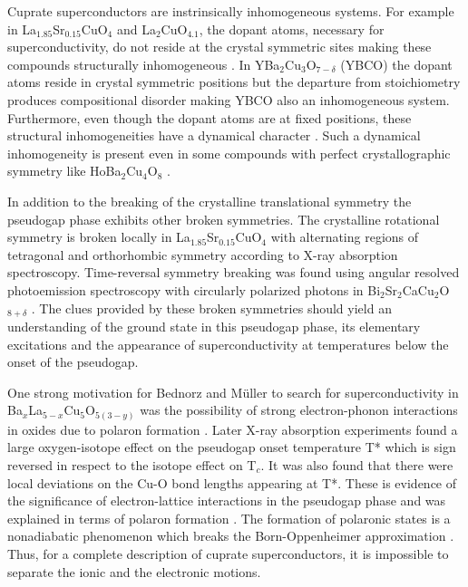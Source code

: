 Cuprate superconductors are instrinsically inhomogeneous systems.
For example in La$_{1.85}$Sr$_{0.15}$CuO$_{4}$ and La$_{2}$CuO$_{4.1}$, the dopant atoms, necessary for superconductivity, do not reside at the crystal symmetric sites making these compounds structurally inhomogeneous \cite{Poccia2011}.
In YBa$_2$Cu$_3$O$_{7-\delta}$ (YBCO) the dopant atoms reside in crystal symmetric positions but the departure from stoichiometry produces compositional disorder \cite{Chen1988,Andersen1990} making YBCO also an inhomogeneous system.
Furthermore, even though the dopant atoms are at fixed positions, these structural inhomogeneities have a dynamical character \cite{Mihailovic2005,Bianconi1996}.
Such a dynamical inhomogeneity is present even in some compounds with perfect crystallographic symmetry like HoBa$_{2}$Cu$_{4}$O$_{8}$ \cite{RubioTemprano2000}.

In addition to the breaking of the crystalline translational symmetry the pseudogap phase exhibits other broken symmetries. 
The crystalline rotational symmetry is broken locally in La$_{1.85}$Sr$_{0.15}$CuO$_{4}$ with alternating regions of tetragonal and orthorhombic symmetry \cite{Bianconi1996} according to X-ray absorption spectroscopy. 
Time-reversal symmetry breaking was found using angular resolved photoemission spectroscopy with circularly polarized photons in Bi$_{2}$Sr$_{2}$CaCu$_{2}$O$_{8+\delta}$ \cite{Kaminski2002}. 
The clues provided by these broken symmetries should yield an understanding of the ground state in this pseudogap phase, its elementary excitations and the appearance of superconductivity at temperatures below the onset of the pseudogap. 

One strong motivation for Bednorz and M\"{u}ller to search for superconductivity in Ba$_x$La$_{5-x}$Cu$_5$O$_{5(3-y)}$ was the possibility of strong electron-phonon interactions in oxides due to polaron formation \cite{Bednorz1986}.
Later X-ray absorption experiments found a large oxygen-isotope effect on the pseudogap onset temperature T* which is sign reversed in respect to the isotope effect on T$_c$.
It was also found that there were local deviations on the Cu-O bond lengths appearing at T*.
These is evidence of the significance of electron-lattice interactions in the pseudogap phase and was explained in terms of polaron formation \cite{MustredeLeon1992}.
The formation of polaronic states is a nonadiabatic phenomenon which breaks the Born-Oppenheimer approximation \cite{Born1927}.
Thus, for a complete description of cuprate superconductors, it is impossible to separate the ionic and the electronic motions.

